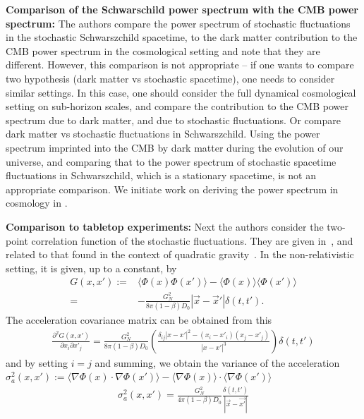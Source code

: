 \documentclass[aps,pra,amsmath,amssymb,amsthm,floatfix,nofootinbib,notitlepage,superscriptaddress,10pt]{revtex4-2}
\begin{document}
{\bf\noindent Comparison of the Schwarschild power spectrum with the CMB power spectrum:} The authors compare the power spectrum of stochastic fluctuations in the stochastic Schwarszchild spacetime, to the dark matter contribution to the CMB power spectrum in the cosmological setting and note that they are different.
However, this comparison is not appropriate -- if one wants to compare two hypothesis (dark matter vs stochastic spacetime), one needs to consider similar settings. In this case, one should consider the full dynamical cosmological setting on sub-horizon scales, and compare the contribution to the CMB power spectrum due to dark matter, and due to stochastic fluctuations. Or compare dark matter vs stochastic fluctuations in Schwarszchild. Using the power spectrum imprinted into the CMB by dark matter during the evolution of our universe, and comparing that to the power spectrum of stochastic spacetime fluctuations in Schwarszchild, which is a stationary spacetime, is not an appropriate comparison. We initiate work on deriving the power spectrum in cosmology in \cite{UCLcosmo}.

{\bf\noindent Comparison to tabletop experiments:} Next the authors consider the two-point correlation function of the stochastic fluctuations. They are given in~\cite{oppenheim2023gravitationally,grudka2023renormalisable}, and related to that found in the context of quadratic gravity~\cite{stelle1978classical}. In the non-relativistic setting, it is given, up to a constant, by~\cite{oppenheim2023gravitationally,grudka2023renormalisable}
\begin{align*}
	G(x,x'):=& \langle \Phi(x)\Phi(x')\rangle-\langle \Phi(x)\rangle\langle\Phi(x')\rangle
	\nonumber\\
	=&-\frac{G_N^2}{8 \pi(1-\beta) D_0}|\vec{x}-\vec{x}'|\delta(t,t').
\end{align*}
The acceleration covariance matrix can be obtained from this
\begin{align}
	\frac{\partial^2 G(x,x')}{ \partial{x_i}\partial{x'_j}}=\frac{G_N^2}{8\pi(1-\beta) D_{0}} \left( \frac{\delta_{ij} |x - x'|^2 - (x_i - x'_i)(x_j - x'_j)}{|x - x'|^3} \right)\delta(t,t')
\end{align}
and by setting $i=j$ and summing, we obtain the variance of the acceleration $\sigma^2_a(x,x'):=\langle\nabla\Phi(x)\cdot\nabla\Phi(x')\rangle-\langle\nabla\Phi(x)\rangle\cdot\langle\nabla\Phi(x')\rangle$
\begin{align}
	\sigma^2_a(x,x')=\frac{G_N^2}{4\pi(1-\beta) D_{0}}\frac{\delta(t,t')}{|\vec{x}-\vec{x'}|}
\end{align}
\end{document}
